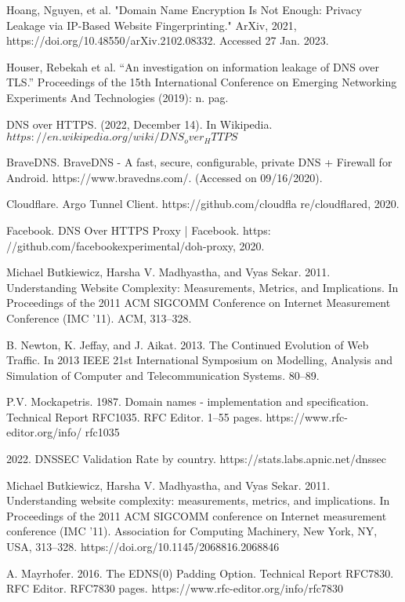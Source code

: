 \begin{thebibliography}{1}
 Hoang, Nguyen, et al. "Domain Name Encryption Is Not Enough: Privacy Leakage via IP-Based Website Fingerprinting." ArXiv, 2021,  https://doi.org/10.48550/arXiv.2102.08332. Accessed 27 Jan. 2023.

 Houser, Rebekah et al. “An investigation on information leakage of DNS over TLS.” Proceedings of the 15th International Conference on Emerging Networking Experiments And Technologies (2019): n. pag.

 DNS over HTTPS. (2022, December 14). In Wikipedia. $https://en.wikipedia.org/wiki/DNS_over_HTTPS$

 BraveDNS. BraveDNS - A fast, secure, configurable, private DNS + Firewall for Android. https://www.bravedns.com/. (Accessed on 09/16/2020).


 Cloudflare. Argo Tunnel Client. https://github.com/cloudfla re/cloudflared, 2020.


Facebook. DNS Over HTTPS Proxy | Facebook. https: //github.com/facebookexperimental/doh-proxy, 2020.

Michael Butkiewicz, Harsha V. Madhyastha, and Vyas Sekar. 2011. Understanding
Website Complexity: Measurements, Metrics, and Implications. In Proceedings of
the 2011 ACM SIGCOMM Conference on Internet Measurement Conference (IMC
’11). ACM, 313–328.

B. Newton, K. Jeffay, and J. Aikat. 2013. The Continued Evolution of Web Traffic. In 2013 IEEE 21st International Symposium on Modelling, Analysis and Simulation of Computer and Telecommunication Systems. 80–89.

P.V. Mockapetris. 1987. Domain names - implementation and specification. Technical Report RFC1035. RFC Editor. 1–55 pages. https://www.rfc-editor.org/info/ rfc1035


2022. DNSSEC Validation Rate by country. https://stats.labs.apnic.net/dnssec


Michael Butkiewicz, Harsha V. Madhyastha, and Vyas Sekar. 2011. Understanding website complexity: measurements, metrics, and implications. In Proceedings of the 2011 ACM SIGCOMM conference on Internet measurement conference (IMC '11). Association for Computing Machinery, New York, NY, USA, 313–328. https://doi.org/10.1145/2068816.2068846


A. Mayrhofer. 2016. The EDNS(0) Padding Option. Technical Report RFC7830.
RFC Editor. RFC7830 pages. https://www.rfc-editor.org/info/rfc7830


\end{thebibliography}
